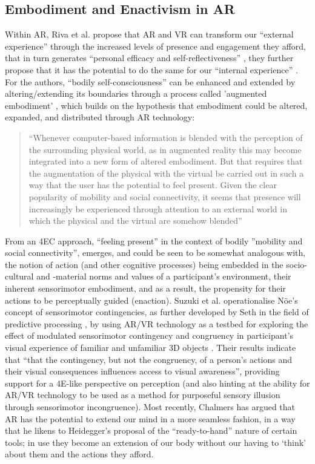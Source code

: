 \subsection{Embodiment and Enactivism in AR}
Within AR, Riva et al. propose that AR and VR can transform our “external experience” through the increased levels of presence and engagement they afford, that in turn generates “personal efficacy and self-reflectiveness” \citeyearpar[p. 10]{riva2016}, they further propose that it has the potential to do the same for our “internal experience” . For the authors, “bodily self-consciousness” can be enhanced and extended by altering/extending its boundaries through a process called ’augmented embodiment’ , which builds on the hypothesis that embodiment could be altered, expanded, and distributed through AR technology: 
\begin{quote}
    “Whenever computer-based information is blended with the perception of the surrounding physical world, as in augmented reality this may become integrated into a new form of altered embodiment. But that requires that the augmentation of the physical with the virtual be carried out in such a way that the user has the potential to feel present. Given the clear popularity of mobility and social connectivity, it seems that presence will increasingly be experienced through attention to an external world in which the physical and the virtual are somehow blended” \citep[]{waterworth2014}
\end{quote}
From an 4EC approach, “feeling present” in the context of bodily ”mobility and social connectivity”, emerges, and could be seen to be somewhat analogous with, the notion of action (and other cognitive processes) being embedded in the  socio-cultural and -material norms and values of a participant’s environment, their inherent sensorimotor embodiment, and as a result, the propensity for their actions to be perceptually guided (enaction). Suzuki et al. operationalise Nöe’s \citeyearpar[]{noe2004} concept of sensorimotor contingencies, as further developed by Seth in the field of predictive processing \citeyearpar[]{seth2014}, by using AR/VR technology as a testbed for exploring the effect of modulated sensorimotor contingency and congruency in participant’s visual experience of familiar and unfamiliar 3D objects \citep[]{suzuki2019}. Their results indicate that “that the contingency, but not the congruency, of a person’s actions and their visual consequences influences access to visual awareness”, providing support for a 4E-like perspective on perception (and also hinting at the ability for AR/VR technology to be used as a method for purposeful sensory illusion through sensorimotor incongruence). Most recently, Chalmers has argued that AR has the potential to extend our mind in a more seamless fashion, in a way that he likens to Heidegger’s proposal of the “ready-to-hand” nature of certain tools; in use they become an extension of our body without our having to ‘think’ about them and the actions they afford.
